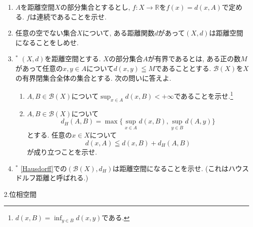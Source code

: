 \documentclass[dvipdfmx,a4paper,11pt]{article}
\newcommand{\R}{\mathbb{R}}
\theoremstyle{definition}
\begin{document}
\begin{enumerate}[label=\textbf{問}1.\arabic*]

  \item $A$を距離空間$X$の部分集合とするとし, $f : X \rightarrow \R$を$f(x) =d(x,A)$で定める. $f$は連続であることを示せ.
  
  
  \item 任意の空でない集合$X$について, ある距離関数$d$があって$(X,d)$は距離空間になることをしめせ.
  
    \item $^{*}$\label{Hausdorff} $(X,d)$を距離空間とする. $X$の部分集合$A$が有界であるとは, ある正の数$M$があって任意の$x, y \in A$について$d(x,y) \leqq M$であることとする. $\mathcal{B}(X)$を$X$の有界閉集合全体の集合とする. 次の問いに答えよ.
    \begin{enumerate}
    	\item $A,B \in \mathcal{B}(X)$について$\sup_{x \in A}d(x,B) < + \infty$であることを示せ.\footnote{$d(x,B) = \inf_{y \in B} d(x,y)$である.}
	\item $A,B \in \mathcal{B}(X)$について
	$$
	d_{H}(A,B) = \max \{ \sup_{x \in A}d(x,B), \sup_{y  \in B}d(A,y)\}
	$$
	とする. 任意の$x \in X$について
	$$
	d(x,A) \leqq d(x,B) + d_{H}(A,B) 
	$$
	が成り立つことを示せ. 
    \end{enumerate}
\item $^{*}$ \ref{Hausdorff}での$(\mathcal{B}(X), d_{H})$は距離空間になることを示せ. (これはハウスドルフ距離と呼ばれる.)
 \end{enumerate}
 
 \newpage
 
 
\begin{center}
{\Large 2.位相空間}
\end{center}
\end{document}
